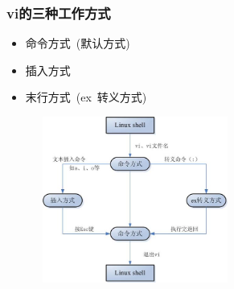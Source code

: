 \frame
{
	\frametitle{\textrm{vi}的三种工作方式}
	\begin{itemize}
		\item 命令方式~\textrm{(默认方式)}
		\item 插入方式
		\item 末行方式~\textrm{(ex~转义方式)}
	\end{itemize}
\begin{figure}[h!]
\centering
\vspace{-6.0pt}
\includegraphics[height=2.15in,width=2.5in,viewport=0 0 610 555,clip]{Figures/vi.jpg}
\label{Linux-vi-command}
\end{figure}
}


